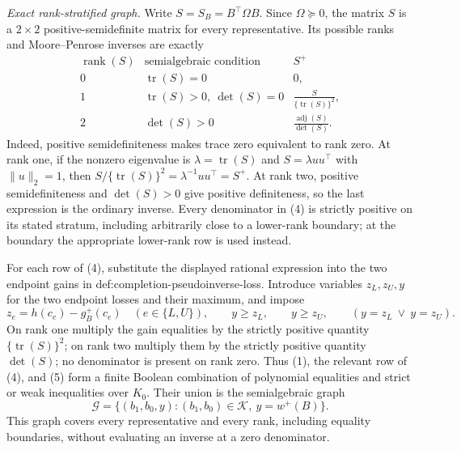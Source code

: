 \emph{Exact rank-stratified graph.}
Write \(S=S_B=B^{\top}\Omega B\).  Since \(\Omega\succeq0\), the matrix \(S\) is a \(2\times2\) positive-semidefinite matrix for every representative.  Its possible ranks and Moore--Penrose inverses are exactly
\[
\begin{array}{c|c|c}
\operatorname{rank}(S)&\text{semialgebraic condition}&S^+\\ \hline
0&\operatorname{tr}(S)=0&0,\\[2mm]
1&\operatorname{tr}(S)>0,\ \det(S)=0&
\displaystyle\frac{S}{\{\operatorname{tr}(S)\}^2},\\[3mm]
2&\det(S)>0&
\displaystyle\frac{\operatorname{adj}(S)}{\det(S)}.
\end{array}
\tag{4}
\]
Indeed, positive semidefiniteness makes trace zero equivalent to rank zero.  At rank one, if the nonzero eigenvalue is \(\lambda=\operatorname{tr}(S)\) and \(S=\lambda uu^{\top}\) with \(\lVert u\rVert_2=1\), then \(S/\{\operatorname{tr}(S)\}^2=\lambda^{-1}uu^{\top}=S^+\).  At rank two, positive semidefiniteness and \(\det(S)>0\) give positive definiteness, so the last expression is the ordinary inverse.  Every denominator in (4) is strictly positive on its stated stratum, including arbitrarily close to a lower-rank boundary; at the boundary the appropriate lower-rank row is used instead.

For each row of (4), substitute the displayed rational expression into the two endpoint gains in def:completion-pseudoinverse-loss.  Introduce variables \(z_L,z_U,y\) for the two endpoint losses and their maximum, and impose
\[
 z_e=h(c_e)-g_B^+(c_e)\quad(e\in\{L,U\}),
 \qquad y\ge z_L,\qquad y\ge z_U,
 \qquad (y=z_L\ \vee\ y=z_U).
\tag{5}
\]
On rank one multiply the gain equalities by the strictly positive quantity \(\{\operatorname{tr}(S)\}^2\); on rank two multiply them by the strictly positive quantity \(\det(S)\); no denominator is present on rank zero.  Thus (1), the relevant row of (4), and (5) form a finite Boolean combination of polynomial equalities and strict or weak inequalities over \(K_0\).  Their union is the semialgebraic graph
\[
 \mathcal G
 =\{(b_1,b_0,y):(b_1,b_0)\in\mathcal K,\ y=w^+(B)\}.
\tag{6}
\]
This graph covers every representative and every rank, including equality boundaries, without evaluating an inverse at a zero denominator.

